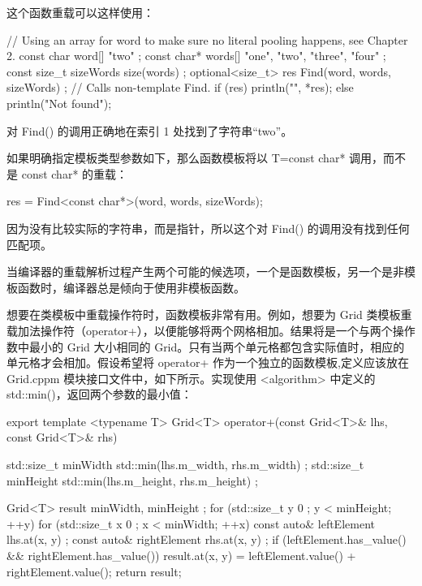 这个函数重载可以这样使用：

\begin{cpp}
// Using an array for word to make sure no literal pooling happens, see Chapter 2.
const char word[] { "two" };
const char* words[] { "one", "two", "three", "four" };
const size_t sizeWords { size(words) };
optional<size_t> res { Find(word, words, sizeWords) }; // Calls non-template Find.
if (res) { println("{}", *res); }
else { println("Not found"); }
\end{cpp}

对 Find() 的调用正确地在索引 1 处找到了字符串“two”。

如果明确指定模板类型参数如下，那么函数模板将以 T=const char* 调用，而不是 const char* 的重载：

\begin{cpp}
res = Find<const char*>(word, words, sizeWords);
\end{cpp}

因为没有比较实际的字符串，而是指针，所以这个对 Find() 的调用没有找到任何匹配项。

当编译器的重载解析过程产生两个可能的候选项，一个是函数模板，另一个是非模板函数时，编译器总是倾向于使用非模板函数。


想要在类模板中重载操作符时，函数模板非常有用。例如，想要为 Grid 类模板重载加法操作符（operator+），以便能够将两个网格相加。结果将是一个与两个操作数中最小的 Grid 大小相同的 Grid。只有当两个单元格都包含实际值时，相应的单元格才会相加。假设希望将 operator+ 作为一个独立的函数模板,定义应该放在 Grid.cppm 模块接口文件中，如下所示。实现使用 <algorithm> 中定义的 std::min()，返回两个参数的最小值：

\begin{cpp}
export template <typename T>
Grid<T> operator+(const Grid<T>& lhs, const Grid<T>& rhs)
{
    std::size_t minWidth { std::min(lhs.m_width, rhs.m_width) };
    std::size_t minHeight { std::min(lhs.m_height, rhs.m_height) };

    Grid<T> result { minWidth, minHeight };
    for (std::size_t y { 0 }; y < minHeight; ++y) {
        for (std::size_t x { 0 }; x < minWidth; ++x) {
            const auto& leftElement { lhs.at(x, y) };
            const auto& rightElement { rhs.at(x, y) };
            if (leftElement.has_value() && rightElement.has_value()) {
                result.at(x, y) = leftElement.value() + rightElement.value();
            }
        }
    }
    return result;
}
\end{cpp}

